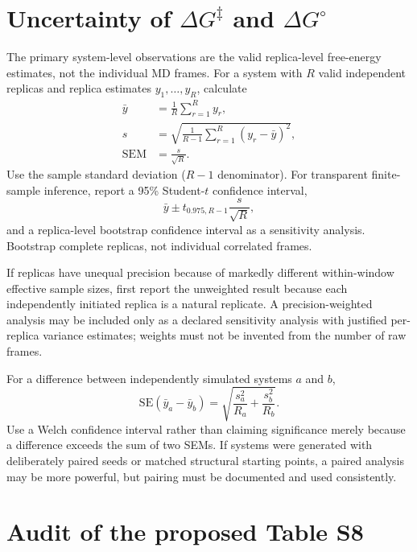 \documentclass[11pt,a4paper]{article}
\begin{document}
\section{Uncertainty of \texorpdfstring{$\Delta G^{\ddagger}$ and $\Delta G^{\circ}$}{activation and reaction free energies}}

The primary system-level observations are the valid replica-level free-energy estimates, not the individual MD frames. For a system with $R$ valid independent replicas and replica estimates $y_1,\ldots,y_R$, calculate
\begin{align}
  \bar y &= \frac{1}{R}\sum_{r=1}^{R}y_r,\\
  s &= \sqrt{\frac{1}{R-1}\sum_{r=1}^{R}(y_r-\bar y)^2},\\
  \mathrm{SEM} &= \frac{s}{\sqrt{R}}.
\end{align}
Use the sample standard deviation ($R-1$ denominator). For transparent finite-sample inference, report a 95\% Student-$t$ confidence interval,
\begin{equation}
  \bar y \pm t_{0.975,R-1}\frac{s}{\sqrt{R}},
\end{equation}
and a replica-level bootstrap confidence interval as a sensitivity analysis. Bootstrap complete replicas, not individual correlated frames.

If replicas have unequal precision because of markedly different within-window effective sample sizes, first report the unweighted result because each independently initiated replica is a natural replicate. A precision-weighted analysis may be included only as a declared sensitivity analysis with justified per-replica variance estimates; weights must not be invented from the number of raw frames.

For a difference between independently simulated systems $a$ and $b$,
\begin{equation}
  \mathrm{SE}(\bar y_a-\bar y_b)
  =\sqrt{\frac{s_a^2}{R_a}+\frac{s_b^2}{R_b}}.
\end{equation}
Use a Welch confidence interval rather than claiming significance merely because a difference exceeds the sum of two SEMs. If systems were generated with deliberately paired seeds or matched structural starting points, a paired analysis may be more powerful, but pairing must be documented and used consistently.

\section{Audit of the proposed Table S8}
\end{document}
